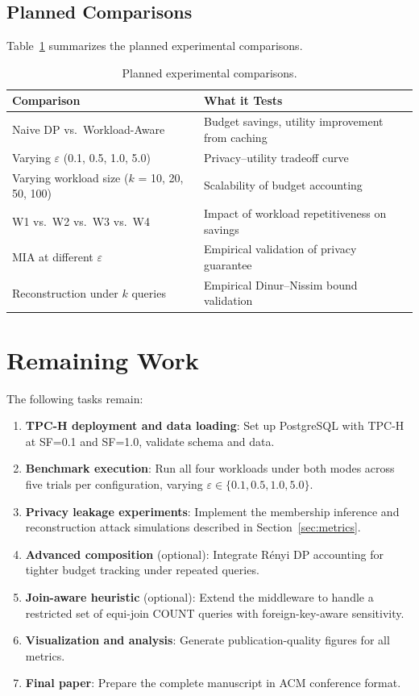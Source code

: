 \documentclass[sigconf,nonacm]{acmart}
\begin{document}
\subsection{Planned Comparisons}

Table~\ref{tab:comparisons} summarizes the planned experimental comparisons.

\begin{table}[h]
\caption{Planned experimental comparisons.}
\label{tab:comparisons}
\begin{tabular}{p{2.2cm}p{5.5cm}}
\toprule
Comparison & What it Tests \\
\midrule
Naive DP vs.\ Workload-Aware & Budget savings, utility improvement from caching \\
Varying $\varepsilon$ (0.1, 0.5, 1.0, 5.0) & Privacy--utility tradeoff curve \\
Varying workload size ($k$ = 10, 20, 50, 100) & Scalability of budget accounting \\
W1 vs.\ W2 vs.\ W3 vs.\ W4 & Impact of workload repetitiveness on savings \\
MIA at different $\varepsilon$ & Empirical validation of privacy guarantee \\
Reconstruction under $k$ queries & Empirical Dinur--Nissim bound validation \\
\bottomrule
\end{tabular}
\end{table}

\section{Remaining Work}
\label{sec:remaining}

The following tasks remain:

\begin{enumerate}
    \item \textbf{TPC-H deployment and data loading}: Set up PostgreSQL with TPC-H at SF=0.1 and SF=1.0, validate schema and data.
    \item \textbf{Benchmark execution}: Run all four workloads under both modes across five trials per configuration, varying $\varepsilon \in \{0.1, 0.5, 1.0, 5.0\}$.
    \item \textbf{Privacy leakage experiments}: Implement the membership inference and reconstruction attack simulations described in Section~\ref{sec:metrics}.
    \item \textbf{Advanced composition} (optional): Integrate R\'enyi DP accounting for tighter budget tracking under repeated queries.
    \item \textbf{Join-aware heuristic} (optional): Extend the middleware to handle a restricted set of equi-join COUNT queries with foreign-key-aware sensitivity.
    \item \textbf{Visualization and analysis}: Generate publication-quality figures for all metrics.
    \item \textbf{Final paper}: Prepare the complete manuscript in ACM conference format.
\end{enumerate}
\end{document}
